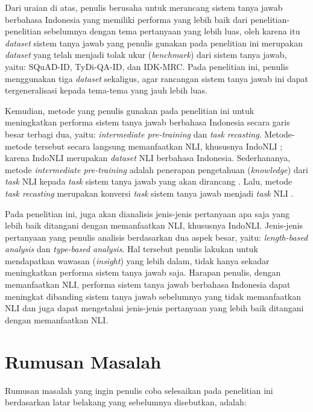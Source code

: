 Dari uraian di atas, penulis berusaha untuk merancang sistem tanya jawab berbahasa Indonesia yang memiliki performa yang lebih baik dari penelitian-penelitian sebelumnya dengan tema pertanyaan yang lebih luas, oleh karena itu \emph{dataset} sistem tanya jawab yang penulis gunakan pada penelitian ini merupakan \emph{dataset} yang telah menjadi tolak ukur (\emph{benchmark}) dari sistem tanya jawab, yaitu: SQuAD-ID, TyDi-QA-ID, dan IDK-MRC. Pada penelitian ini, penulis menggunakan tiga \emph{dataset} sekaligus, agar rancangan sistem tanya jawab ini dapat tergeneralisasi kepada tema-tema yang jauh lebih luas.

Kemudian, metode yang penulis gunakan pada penelitian ini untuk meningkatkan performa sistem tanya jawab berbahasa Indonesia secara garis besar terbagi dua, yaitu: \emph{intermediate pre-training} dan \emph{task recasting}. Metode-metode tersebut secara langsung memanfaatkan NLI, khususnya IndoNLI \citep{mahendra-etal-2021-indonli}; karena IndoNLI merupakan \emph{dataset} NLI berbahasa Indonesia. Sederhananya, metode \emph{intermediate pre-training} adalah penerapan pengetahuan (\emph{knowledge}) dari \emph{task} NLI kepada \emph{task} sistem tanya jawab yang akan dirancang \citep{pruksachatkun-etal-2020-intermediate}. Lalu, metode \emph{task recasting} merupakan konversi \emph{task} sistem tanya jawab menjadi \emph{task} NLI \citep{chen-etal-2021-nli-models}.

Pada penelitian ini, juga akan dianalisis jenis-jenis pertanyaan apa saja yang  lebih baik ditangani dengan memanfaatkan NLI, khususnya IndoNLI. Jenis-jenis pertanyaan yang penulis analisis berdasarkan dua aspek besar, yaitu: \emph{length-based analysis} dan \emph{type-based analysis}. Hal tersebut penulis lakukan untuk mendapatkan wawasan (\emph{insight}) yang lebih dalam, tidak hanya sekadar meningkatkan performa sistem tanya jawab saja. Harapan penulis, dengan memanfaatkan NLI, performa sistem tanya jawab berbahasa Indonesia dapat meningkat dibanding sistem tanya jawab sebelumnya yang tidak memanfaatkan NLI dan juga dapat mengetahui jenis-jenis pertanyaan yang lebih baik ditangani dengan memanfaatkan NLI.

\section{Rumusan Masalah}
\label{sec:rumusanMasalah}
Rumusan masalah yang ingin penulis coba selesaikan pada penelitian ini berdasarkan latar belakang yang sebelumnya disebutkan, adalah:

